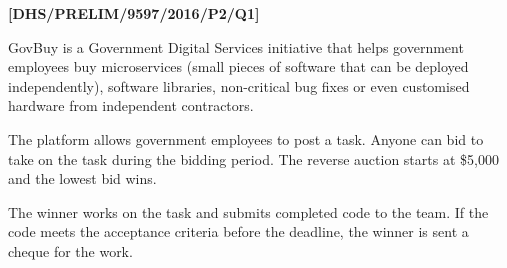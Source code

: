 \item \textbf{{[}DHS/PRELIM/9597/2016/P2/Q1{]} }

GovBuy is a Government Digital Services initiative that helps government
employees buy microservices (small pieces of software that can be
deployed independently), software libraries, non-critical bug fixes
or even customised hardware from independent contractors. 

The platform allows government employees to post a task. Anyone can
bid to take on the task during the bidding period. The reverse auction
starts at \$5,000 and the lowest bid wins.

The winner works on the task and submits completed code to the team.
If the code meets the acceptance criteria before the deadline, the
winner is sent a cheque for the work.

